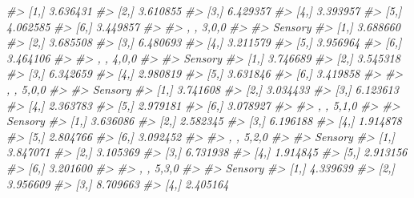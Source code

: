 \documentclass[
]{article}
\newenvironment{Shaded}{\begin{snugshade}}{\end{snugshade}}
\newcommand{\CommentTok}[1]{\textcolor[rgb]{0.56,0.35,0.01}{\textit{#1}}}
\begin{document}
\begin{Shaded}
\begin{Highlighting}[]
\CommentTok{\#\textgreater{} [1,] 3.636431}
\CommentTok{\#\textgreater{} [2,] 3.610855}
\CommentTok{\#\textgreater{} [3,] 6.429357}
\CommentTok{\#\textgreater{} [4,] 3.393957}
\CommentTok{\#\textgreater{} [5,] 4.062585}
\CommentTok{\#\textgreater{} [6,] 3.449857}
\CommentTok{\#\textgreater{} }
\CommentTok{\#\textgreater{} , , 3,0,0}
\CommentTok{\#\textgreater{} }
\CommentTok{\#\textgreater{}       Sensory}
\CommentTok{\#\textgreater{} [1,] 3.688660}
\CommentTok{\#\textgreater{} [2,] 3.685508}
\CommentTok{\#\textgreater{} [3,] 6.480693}
\CommentTok{\#\textgreater{} [4,] 3.211579}
\CommentTok{\#\textgreater{} [5,] 3.956964}
\CommentTok{\#\textgreater{} [6,] 3.464106}
\CommentTok{\#\textgreater{} }
\CommentTok{\#\textgreater{} , , 4,0,0}
\CommentTok{\#\textgreater{} }
\CommentTok{\#\textgreater{}       Sensory}
\CommentTok{\#\textgreater{} [1,] 3.746689}
\CommentTok{\#\textgreater{} [2,] 3.545318}
\CommentTok{\#\textgreater{} [3,] 6.342659}
\CommentTok{\#\textgreater{} [4,] 2.980819}
\CommentTok{\#\textgreater{} [5,] 3.631846}
\CommentTok{\#\textgreater{} [6,] 3.419858}
\CommentTok{\#\textgreater{} }
\CommentTok{\#\textgreater{} , , 5,0,0}
\CommentTok{\#\textgreater{} }
\CommentTok{\#\textgreater{}       Sensory}
\CommentTok{\#\textgreater{} [1,] 3.741608}
\CommentTok{\#\textgreater{} [2,] 3.034433}
\CommentTok{\#\textgreater{} [3,] 6.123613}
\CommentTok{\#\textgreater{} [4,] 2.363783}
\CommentTok{\#\textgreater{} [5,] 2.979181}
\CommentTok{\#\textgreater{} [6,] 3.078927}
\CommentTok{\#\textgreater{} }
\CommentTok{\#\textgreater{} , , 5,1,0}
\CommentTok{\#\textgreater{} }
\CommentTok{\#\textgreater{}       Sensory}
\CommentTok{\#\textgreater{} [1,] 3.636086}
\CommentTok{\#\textgreater{} [2,] 2.582345}
\CommentTok{\#\textgreater{} [3,] 6.196188}
\CommentTok{\#\textgreater{} [4,] 1.914878}
\CommentTok{\#\textgreater{} [5,] 2.804766}
\CommentTok{\#\textgreater{} [6,] 3.092452}
\CommentTok{\#\textgreater{} }
\CommentTok{\#\textgreater{} , , 5,2,0}
\CommentTok{\#\textgreater{} }
\CommentTok{\#\textgreater{}       Sensory}
\CommentTok{\#\textgreater{} [1,] 3.847071}
\CommentTok{\#\textgreater{} [2,] 3.105369}
\CommentTok{\#\textgreater{} [3,] 6.731938}
\CommentTok{\#\textgreater{} [4,] 1.914845}
\CommentTok{\#\textgreater{} [5,] 2.913156}
\CommentTok{\#\textgreater{} [6,] 3.201600}
\CommentTok{\#\textgreater{} }
\CommentTok{\#\textgreater{} , , 5,3,0}
\CommentTok{\#\textgreater{} }
\CommentTok{\#\textgreater{}       Sensory}
\CommentTok{\#\textgreater{} [1,] 4.339639}
\CommentTok{\#\textgreater{} [2,] 3.956609}
\CommentTok{\#\textgreater{} [3,] 8.709663}
\CommentTok{\#\textgreater{} [4,] 2.405164}

\end{Highlighting}
\end{Shaded}
\end{document}
